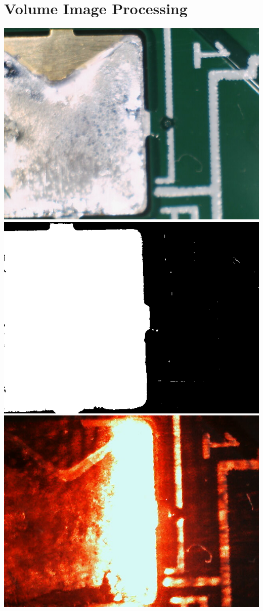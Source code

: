\documentclass[12pt]{article}
\begin{document}
\section{Volume Image Processing}
\includegraphics[scale=0.8]{images/volume_image_processing/led_image.png}
\newpage
\includegraphics[scale=0.8]{images/volume_image_processing/binary_led_image.png}
\newpage
\includegraphics[scale=0.8]{images/volume_image_processing/laser_image.png}
\end{document}

